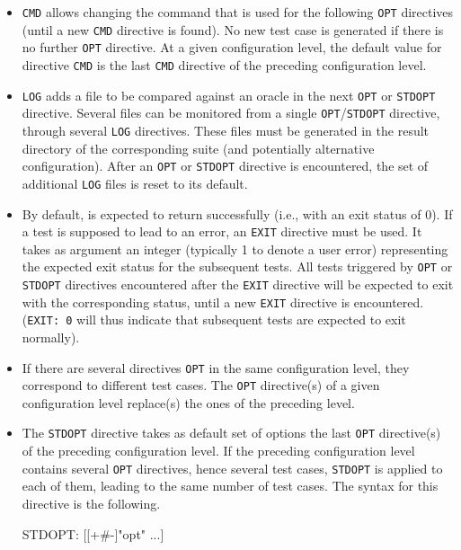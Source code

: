 \begin{itemize}
\item
  \texttt{CMD} allows changing the command that is used for the
  following \texttt{OPT} directives (until a new \texttt{CMD}
  directive is found). No new test case is generated
  if there is no further \texttt{OPT} directive. At a given
  configuration level, the default value for directive
  \texttt{CMD} is the last
  \texttt{CMD} directive of the preceding configuration level.
\item \texttt{LOG} adds a file to be compared against an oracle in the
  next \texttt{OPT} or \texttt{STDOPT} directive. Several files can be monitored from a single
  \texttt{OPT}/\texttt{STDOPT} directive, through several \texttt{LOG} directives. 
  These files must be generated in the result
  directory of the corresponding suite (and potentially alternative
  configuration).
  After an \texttt{OPT} or \texttt{STDOPT} directive is encountered,
  the set of additional \texttt{LOG} files is reset to its default.
\item By default, \framac is expected to return successfully (i.e., with
  an exit status of 0). If a test is supposed to lead to an error, an
  \texttt{EXIT} directive must be used. It takes as argument an integer
  (typically 1 to denote a user error) representing the expected exit status
  for the subsequent tests. All tests triggered by \texttt{OPT} or
  \texttt{STDOPT} directives encountered after the \texttt{EXIT} directive
  will be expected to exit with the corresponding status, until a new
  \texttt{EXIT} directive is encountered. (\texttt{EXIT: 0} will thus
  indicate that subsequent tests are expected to exit normally).
\item If there are several directives \texttt{OPT} in the same
  configuration level, they correspond to different test cases. The
  \texttt{OPT} directive(s) of a given configuration level replace(s)
  the ones of the preceding level.
\item The \texttt{STDOPT}
  directive takes as default set of options
  the last \texttt{OPT} directive(s) of the preceding configuration
  level. If the preceding configuration level contains several
  \texttt{OPT} directives, hence several test cases, \texttt{STDOPT}
  is applied to each of them, leading to the same number of test cases.
  The syntax for this directive is the following.
  \begin{code}
    STDOPT: [[+#-]"opt" ...]
  \end{code}

\end{itemize}
